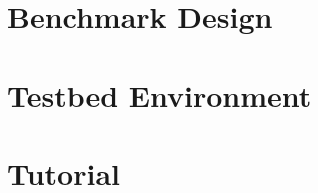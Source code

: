 \documentclass{book}
\begin{document}
\chapter{Benchmark Design}
\label{chap:benchmark_design}


\chapter{Testbed Environment}

\label{chap:textbed_environment}

\chapter{Tutorial}

\label{chap:tutorial}



\end{document}
